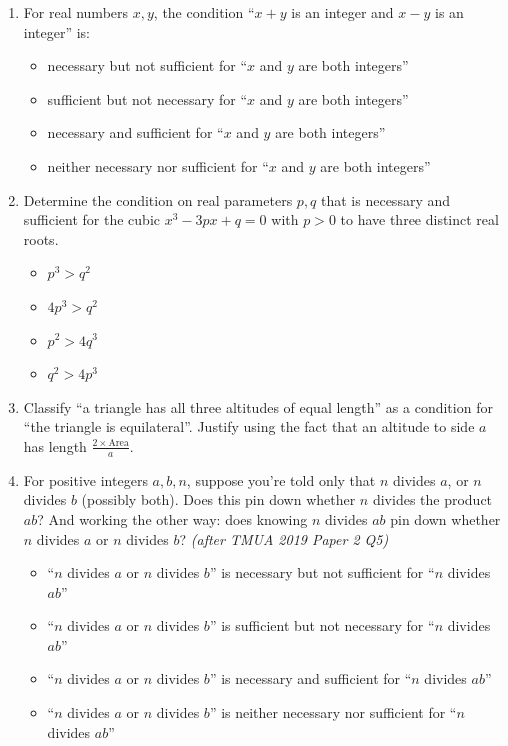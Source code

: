 \documentclass[11pt,a4paper]{article}
\begin{document}
\begin{enumerate}

\item For real numbers $x,y$, the condition ``$x+y$ is an integer and $x-y$ is an integer'' is:
\begin{itemize}
\item[A)] necessary but not sufficient for ``$x$ and $y$ are both integers''
\item[B)] sufficient but not necessary for ``$x$ and $y$ are both integers''
\item[C)] necessary and sufficient for ``$x$ and $y$ are both integers''
\item[D)] neither necessary nor sufficient for ``$x$ and $y$ are both integers''
\end{itemize}

\item Determine the condition on real parameters $p, q$ that is necessary and sufficient for the cubic $x^3 - 3px + q = 0$ with $p > 0$ to have three distinct real roots.
\begin{itemize}
\item[A)] $p^3 > q^2$
\item[B)] $4p^3 > q^2$
\item[C)] $p^2 > 4q^3$
\item[D)] $q^2 > 4p^3$
\end{itemize}

\item Classify ``a triangle has all three altitudes of equal length'' as a condition for ``the triangle is equilateral''. Justify using the fact that an altitude to side $a$ has length $\frac{2\times\text{Area}}{a}$.

\item For positive integers $a,b,n$, suppose you're told only that $n$ divides $a$, or $n$ divides $b$ (possibly both). Does this pin down whether $n$ divides the product $ab$? And working the other way: does knowing $n$ divides $ab$ pin down whether $n$ divides $a$ or $n$ divides $b$? \textit{\small(after TMUA 2019 Paper 2 Q5)}
\begin{itemize}
\item[A)] ``$n$ divides $a$ or $n$ divides $b$'' is necessary but not sufficient for ``$n$ divides $ab$''
\item[B)] ``$n$ divides $a$ or $n$ divides $b$'' is sufficient but not necessary for ``$n$ divides $ab$''
\item[C)] ``$n$ divides $a$ or $n$ divides $b$'' is necessary and sufficient for ``$n$ divides $ab$''
\item[D)] ``$n$ divides $a$ or $n$ divides $b$'' is neither necessary nor sufficient for ``$n$ divides $ab$''
\end{itemize}


\end{enumerate}
\end{document}
